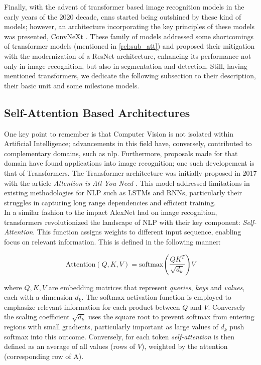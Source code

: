 \noindent Finally, with the advent of transformer based image recognition models in the early years of the 
2020 decade, \glspl{cnn} started being outshined by these kind of models; however, an architecture 
incorporating the key principles of these models was presented, ConvNeXt \autocite{liu2022convnet}.
These family of models addressed some shortcomings of transformer models (mentioned in 
\autoref{rel:sub_att}) and proposed their mitigation with the modernization of a ResNet 
architecture, enhancing its performance not only in image recognition, but also in segmentation and 
detection. Still, having mentioned transformers, we dedicate the following subsection to their 
description, their basic unit and some milestone models.


\subsection{Self-Attention Based Architectures}
\label{rel:sub_att}
One key point to remember is that Computer Vision is not isolated within Artificial 
Intelligence; advancements in this field have, conversely, contributed to complementary domains, 
such as \gls{nlp}. Furthermore, proposals made for that domain have found applications into image 
recognition; one such developement is that of Transformers. The Transformer architecture was 
initially proposed in 2017 with the article \emph{Attention is All You Need} 
\autocite{vaswani2017attention}. This model addressed limitations in existing methodologies for 
NLP such as LSTMs and RNNs, particularly their struggles in capturing long range dependencies 
and efficient training.\\

\noindent In a similar fashion to the impact AlexNet had on image recognition, transformers 
revolutionized the landscape of NLP with their key component: \emph{Self-Attention}. This function 
assigns weights to different input sequence, enabling focus on relevant information. 
This is defined in the following manner:

\begin{equation}
    \mbox{Attention}(Q, K, V) = \mbox{softmax}\left(\frac{QK^T}{\sqrt{d_k}}\right) V
    \label{eq:att}
\end{equation}

\noindent where $Q, K, V$ are embedding matrices that represent \emph{queries}, \emph{keys} and 
\emph{values}, each with a dimension $d_k$. The softmax activation function is employed to 
emphasize relevant information for each product between $Q$ and $V$. Conversely the scaling 
coefficient $\sqrt{d_k}$ uses the square root to prevent softmax from entering regions with small 
gradients, particularly important as large values of $d_k$ push softmax into this outcome. 
Conversely, for each token \emph{self-attention} is then defined as an average of all values 
(rows of $V$), weighted by the attention (corresponding row of A).


